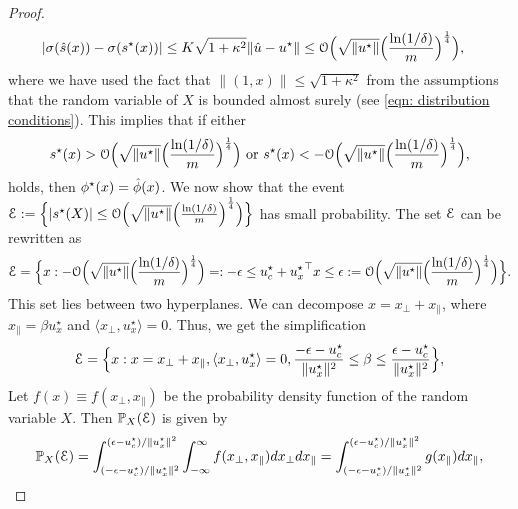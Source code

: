 \begin{proof}
\begin{equation*}
    \begin{aligned}
        |\sigma(\hat{s}(x)) - \sigma(s^\star(x))| &
        \leq K\sqrt{1+\kappa^2}\|\hat{u} - u^\star\|\leq \mathcal{O}\Big(\sqrt{\|u^\star\|}\Big(\frac{\ln(1/\delta)}{m}\Big)^{\frac{1}{4}}\Big),
    \end{aligned}
    \end{equation*}
    where we have used the fact that $\|(1,x)\| \leq \sqrt{1+\kappa^2}$ from the assumptions that the random variable of $X$ is bounded almost surely (see \eqref{eqn: distribution conditions}).
    This implies that if either
    \begin{equation*}
    \begin{aligned}
        s^\star(x) > \mathcal{O}\Big(\sqrt{\|u^\star\|}\Big(\frac{\ln(1/\delta)}{m}\Big)^{\frac{1}{4}}\Big) \text{ or } s^\star(x) <  -\mathcal{O}\Big(\sqrt{\|u^\star\|}\Big(\frac{\ln(1/\delta)}{m}\Big)^{\frac{1}{4}}\Big),
        \end{aligned}
    \end{equation*}
    holds, then $\phi^\star(x) = \hat{\phi}(x)$.
We now show that the event $\mathcal{E} := \Big\{|s^\star(X)| \leq  \mathcal{O}\Big(\sqrt{\|u^\star\|}\Big(\frac{\ln(1/\delta)}{m}\Big)^{\frac{1}{4}}\Big)\Big\}$ has small probability.
The set $\mathcal{E}$ can be rewritten as 
\begin{equation*}
\mathcal{E} = \Big\{x : -\mathcal{O}\Big(\sqrt{\|u^\star\|}\Big(\frac{\ln(1/\delta)}{m}\Big)^{\frac{1}{4}}\Big)  =: -\epsilon \leq  u^\star_c + {u^\star_x}^\top x \leq \epsilon := \mathcal{O}\Big(\sqrt{\|u^\star\|}\Big(\frac{\ln(1/\delta)}{m}\Big)^{\frac{1}{4}}\Big)\Big\}.
\end{equation*} 
This set lies between two hyperplanes. We can decompose $x = x_{\perp} + x_\parallel$, where $x_\parallel = \beta u^\star_x$ and $\langle x_\perp, u^\star_x \rangle = 0$. Thus, we get the simplification
\begin{equation*}
\mathcal{E}  = \Big\{x: x = x_\perp + x_\parallel, \langle x_\perp, u^\star_x \rangle = 0, \frac{-\epsilon - u^\star_c}{\|u^\star_x\|^2} \leq \beta \leq \frac{\epsilon - u^\star_c}{\|u^\star_x\|^2}\Big\},
\end{equation*}
Let $f(x) \equiv f(x_\perp,x_\parallel)$ be the probability density function of the random variable $X$. Then $\mathbb{P}_X(\mathcal{E})$ is given by
\begin{equation*}
    \prob_X(\cg{E}) = \int_{(-\eps - u^\star_c)/\|u^\star_x\|^2}^{(\eps - u^\star_c)/\|u^\star_x\|^2} \int_{-\infty}^\infty f(x_\perp,x_\parallel) dx_\perp dx_\parallel = \int_{(-\eps - u^\star_c)/\|u^\star_x\|^2}^{(\eps - u^\star_c)/\|u^\star_x\|^2} g(x_\parallel) dx_{\parallel},

\end{equation*}
\end{proof}
